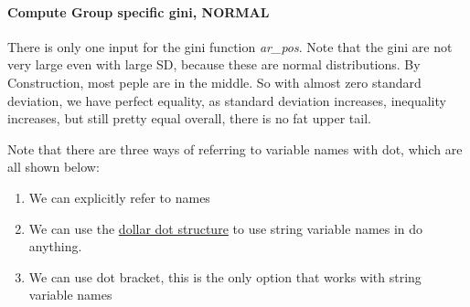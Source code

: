 \documentclass[
]{book}
\newenvironment{Shaded}{\begin{snugshade}}{\end{snugshade}}
\newcommand{\CommentTok}[1]{\textcolor[rgb]{0.56,0.35,0.01}{\textit{#1}}}
\newcommand{\DataTypeTok}[1]{\textcolor[rgb]{0.13,0.29,0.53}{#1}}
\newcommand{\DecValTok}[1]{\textcolor[rgb]{0.00,0.00,0.81}{#1}}
\newcommand{\FloatTok}[1]{\textcolor[rgb]{0.00,0.00,0.81}{#1}}
\newcommand{\KeywordTok}[1]{\textcolor[rgb]{0.13,0.29,0.53}{\textbf{#1}}}
\newcommand{\NormalTok}[1]{#1}
\newcommand{\OperatorTok}[1]{\textcolor[rgb]{0.81,0.36,0.00}{\textbf{#1}}}
\newcommand{\OtherTok}[1]{\textcolor[rgb]{0.56,0.35,0.01}{#1}}
\newcommand{\StringTok}[1]{\textcolor[rgb]{0.31,0.60,0.02}{#1}}
\providecommand{\tightlist}{%
  \setlength{\itemsep}{0pt}\setlength{\parskip}{0pt}}
\begin{document}
\begin{Shaded}
\end{Shaded}

\hypertarget{compute-group-specific-gini-normal}{%
\paragraph{Compute Group specific gini, NORMAL}\label{compute-group-specific-gini-normal}}

There is only one input for the gini function \emph{ar\_pos}. Note that the gini are not very large even with large SD, because these are normal distributions. By Construction, most peple are in the middle. So with almost zero standard deviation, we have perfect equality, as standard deviation increases, inequality increases, but still pretty equal overall, there is no fat upper tail.

Note that there are three ways of referring to variable names with dot, which are all shown below:

\begin{enumerate}
\def\labelenumi{\arabic{enumi}.}
\tightlist
\item
  We can explicitly refer to names
\item
  We can use the \href{https://stackoverflow.com/a/18228613/8280804}{dollar dot structure} to use string variable names in do anything.
\item
  We can use dot bracket, this is the only option that works with string variable names
\end{enumerate}
\end{document}
